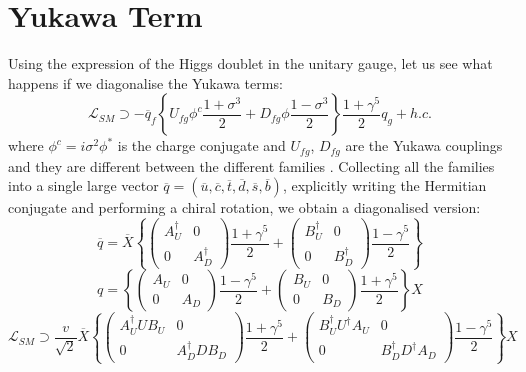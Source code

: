 \documentclass[11pt,a4paper,twoside,openright]{report}
\begin{document}
\section{Yukawa Term}
Using the expression of the Higgs doublet in the unitary gauge, let us see what happens if we diagonalise the Yukawa terms:
\begin{equation}
\mathcal{L}_{SM} \supset -\overline{q}_f \left\{ U_{fg}\phi^c\frac{1+\sigma^3}{2}+D_{fg}\phi\frac{1-\sigma^3}{2} \right\}\frac{1+\gamma^5}{2}q_g+h.c.
\end{equation}
where \(\phi^c=i\sigma^2\phi^*\) is the charge conjugate and $U_{fg}$, $D_{fg}$ are the Yukawa couplings and they are different between the different families . Collecting all the families into a single large vector \(\overline{q}=(\overline{u},\overline{c},\overline{t},\overline{d},\overline{s},\overline{b})\), explicitly writing the Hermitian conjugate and performing a chiral rotation, we obtain a diagonalised version:
\begin{equation}
\overline{q}=\overline{X}\left\{ \begin{pmatrix} A_U^\dagger & 0 \\ 0 & A_D^\dagger \end{pmatrix} \frac{1+\gamma^5}{2} + \begin{pmatrix} B_U^\dagger & 0 \\ 0 & B_D^\dagger \end{pmatrix} \frac{1-\gamma^5}{2}  \right\}
\end{equation}
\begin{equation}
q=\left\{ \begin{pmatrix} A_U & 0 \\ 0 & A_D \end{pmatrix} \frac{1-\gamma^5}{2} + \begin{pmatrix} B_U & 0 \\ 0 & B_D \end{pmatrix} \frac{1+\gamma^5}{2}  \right\}X
\end{equation}
\begin{equation}
\mathcal{L}_{SM} \supset\frac{v}{\sqrt{2}}\overline{X} \left\{ \begin{pmatrix} A_U^\dagger UB_U & 0 \\ 0 & A_D^\dagger DB_D \end{pmatrix} \frac{1+\gamma^5}{2} + \begin{pmatrix} B_U^\dagger U^\dagger A_U & 0 \\ 0 & B_D^\dagger D^\dagger A_D \end{pmatrix} \frac{1-\gamma^5}{2}  \right\}X
\end{equation}
\end{document}
